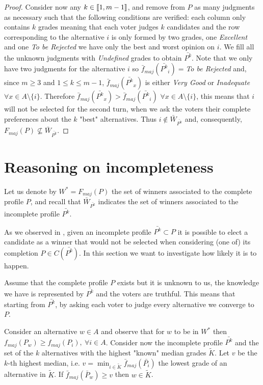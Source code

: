 \documentclass[version=3.21, pagesize, twoside=off, bibliography=totoc, DIV=calc, fontsize=12pt, a4paper]{scrartcl}
\begin{document}
\begin{proof}
	Consider now any $k \in \llbracket1,m-1\rrbracket$, and remove from $P$ as many judgments as necessary such that the following conditions are verified: each column only contains $k$ grades \textemdash meaning that each voter judges $k$ candidates \textemdash and the row corresponding to the alternative $i$ is only formed by two grades, one \textit{Excellent} and one \textit{To be Rejected} \textemdash we have only the best and worst opinion on $i$. We fill all the unknown judgments with \textit{Undefined} grades to obtain $\bar{P^k}$. Note that we only have two judgments for the alternative $i$ so $\bar{f}_{maj}(\bar{P^k}_i)=$\textit{To be Rejected} and, since $m\geq3$ and $1 \leq k \leq m-1$, $\bar{f}_{maj}(\bar{P^k}_x)$ is either \textit{Very Good} or \textit{Inadequate} $\forall x \in A \setminus \{i\}$. Therefore $\bar{f}_{maj}(\bar{P^k}_x) > \bar{f}_{maj}(\bar{P^k}_i)$ $\forall x \in A \setminus \{i\}$, this means that $i$ will not be selected for the second turn, when we ask the voters their complete preferences about the $k$ "best" alternatives. Thus $i \notin \bar{W}_{\bar{P^k}}$ and, consequently, $F_{maj}(P) \nsubseteq \bar{W}_{\bar{P^k}}$.
\end{proof}


\section{Reasoning on incompleteness}
Let us denote by $W^*=F_{maj}(P)$ the set of winners associated to the complete profile $P$, and recall that $\bar{W}_{\bar{P^k}}$ indicates the set of winners associated to the incomplete profile $\bar{P^k}$.

As we observed in , given an incomplete profile $\bar{P^k} \subset P$ it is possible to elect a candidate as a winner that would not be selected when considering (one of) its completion $P \in C(\bar{P^k})$. In this section we want to investigate how likely it is to happen.

Assume that the complete profile $P$ exists but it is unknown to us, the knowledge we have is represented by $\bar{P^k}$ and the voters are truthful. This means that starting from $\bar{P^k}$, by asking each voter to judge every alternative we converge to $P$.

Consider an alternative $w\in A$ and observe that for $w$ to be in $W^*$ then $f_{maj}(P_w)\geq f_{maj}(P_i), \ \forall i \in A$. Consider now the incomplete profile $\bar{P^k}$ and the set of the $k$ alternatives with the highest "known" median grades $\tilde{K}$. Let $v$ be the $k$-th highest median, i.e. $v=\min_{i\in \tilde{K}} \bar{f}_{maj}(\bar{P_i})$ the lowest grade of an alternative in $\tilde{K}$. If $\bar{f}_{maj}(\bar{P}_w) \geq v$ then $w \in \tilde{K}$. 
\end{document}
